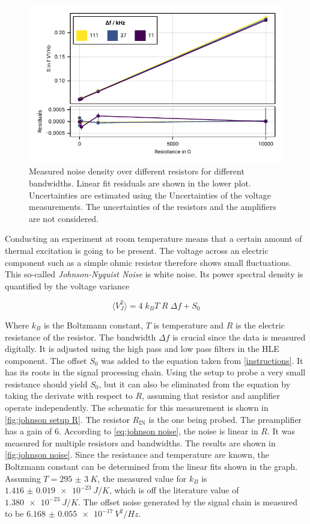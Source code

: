 \documentclass[
    parskip=half, 
    twoside=false,
    twocolumn=true,
    fontsize=11pt,
]{scrarticle}
\begin{document}
\begin{figure}[h!]
    \centering
    \includegraphics{figures/01 johnson noise.pdf}
    \caption{
        Measured noise density over different resistors for different bandwidths.
        Linear fit residuals are shown in the lower plot.
        Uncertainties are estimated using the Uncertainties of the voltage measurements.
        The uncertainties of the resistors and the amplifiers are not considered.
    }
    \label{fig:johnson noise}
\end{figure}

Conducting an experiment at room temperature means that a certain amount of thermal excitation is going to be present. The voltage across an electric component such as a simple ohmic resistor therefore shows small fluctuations. This so-called \textit{Johnson-Nyquist Noise} is white noise. Its power spectral density is quantified by the voltage variance

\begin{equation}
    \label{eq:johnson noise}
    \langle V_J^2 \rangle = 4\; k_B T\; R\; \Delta f + S_0
\end{equation} 

Where $k_B$ is the Boltzmann constant, $T$ is temperature and $R$ is the electric resistance of the resistor. The bandwidth $\Delta f$ is crucial since the data is measured digitally. It is adjusted using the high pass and low pass filters in the HLE component. The offset $S_0$ was added to the equation taken from \autoref{instructions}. It has its roots in the signal processing chain. Using the setup to probe a very small resistance should yield $S_0$, but it can also be eliminated from the equation by taking the derivate with respect to $R$, assuming that resistor and amplifier operate independently. The schematic for this measurement is shown in \autoref{fig:johnson setup R}. The resistor $R_\text{IN}$ is the one being probed. The preamplifier has a gain of $6$.  According to \autoref{eq:johnson noise}, the noise is linear in $R$. It was measured for multiple resistors and bandwidths. The results are shown in \autoref{fig:johnson noise}. Since the resistance and temperature are known, the Boltzmann constant can be determined from the linear fits shown in the graph. Assuming $T=\SI{295(3)}{K}$, the measured value for $k_B$ is $\SI{1.416(19)e-23}{J/K}$, which is off the literature value of $\SI{1.380e-23}{J/K}$. The offset noise generated by the signal chain is measured to be $\SI{6.168(55)e-17}{V^2/Hz}$.
\end{document}
